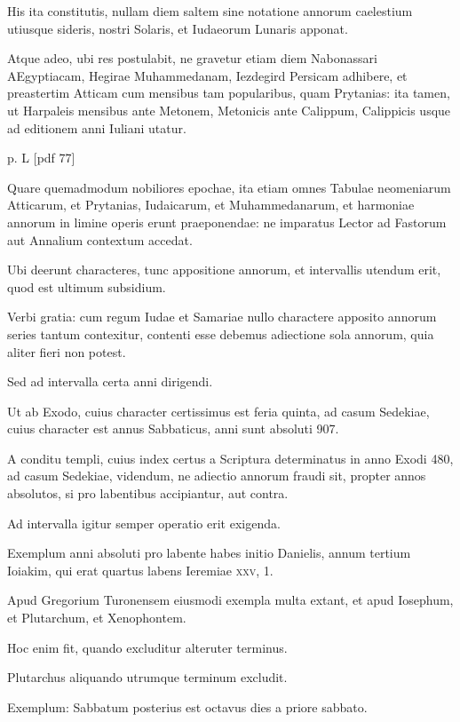 \begin{parnumbers}
His ita constitutis, nullam diem saltem sine
notatione annorum caelestium utiusque sideris, nostri Solaris, et Iudaeorum
Lunaris apponat.

Atque adeo, ubi res postulabit, ne gravetur
etiam diem Nabonassari AEgyptiacam, Hegirae Muhammedanam,
Iezdegird Persicam adhibere, et preastertim Atticam cum mensibus
tam popularibus, quam Prytanias: ita tamen, ut Harpaleis mensibus
ante Metonem, Metonicis ante Calippum, Calippicis usque ad
editionem anni Iuliani utatur.

\clearpage
p. L [pdf 77]

Quare quemadmodum nobiliores epochae,
ita etiam omnes Tabulae neomeniarum Atticarum, et Prytanias,
Iudaicarum, et Muhammedanarum, et harmoniae annorum
in limine operis erunt praeponendae: ne imparatus Lector ad Fastorum
aut Annalium contextum accedat.

Ubi deerunt characteres,
tunc appositione annorum, et intervallis utendum erit, quod est ultimum
subsidium.

Verbi gratia: cum regum Iudae et Samariae nullo
charactere apposito annorum series tantum contexitur, contenti esse
debemus adiectione sola annorum, quia aliter fieri non potest.

Sed
ad intervalla certa anni dirigendi.

Ut ab Exodo, cuius character certissimus
est feria quinta, ad casum Sedekiae, cuius character est annus
Sabbaticus, anni sunt absoluti 907.

A conditu templi, cuius index certus
a Scriptura determinatus in anno Exodi 480, ad casum Sedekiae,
videndum, ne adiectio annorum fraudi sit, propter annos absolutos,
si pro labentibus accipiantur, aut contra.

Ad intervalla igitur
semper operatio erit exigenda.

Exemplum anni absoluti pro labente
habes initio Danielis, annum tertium Ioiakim, qui erat quartus labens
Ieremiae \textsc{xxv}, 1.

Apud Gregorium Turonensem eiusmodi
exempla multa extant, et apud Iosephum, et Plutarchum, et
Xenophontem.

Hoc enim fit, quando excluditur alteruter terminus.

Plutarchus aliquando utrumque terminum excludit.

Exemplum: Sabbatum
posterius est octavus dies a priore sabbato.


\end{parnumbers}
